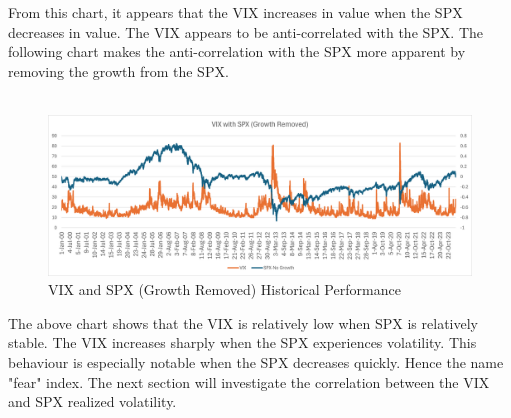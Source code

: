 \documentclass[11pt, oneside]{book}
\begin{document}
From this chart, it appears that the VIX increases in value when the SPX decreases in value. The VIX appears to be anti-correlated with the SPX. The following chart makes the anti-correlation with the SPX more apparent by removing the growth from the SPX.
\\
\\
\begin{figure}[H]
\centering
\includegraphics[width=\textwidth]{VIXandNoGrowthSPX.png}
\caption{VIX and SPX (Growth Removed) Historical Performance} \label{Fig-VIXAndSPXNoGrowth}
\end{figure}
\noindent
The above chart shows that the VIX is relatively low when SPX is relatively stable. The VIX increases sharply when the SPX experiences volatility. This behaviour is especially notable when the SPX decreases quickly. Hence the name "fear" index. The next section will investigate the correlation between the VIX and SPX realized volatility.
\end{document}
